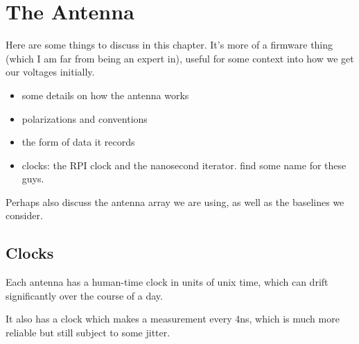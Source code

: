 \chapter{The Antenna}
\label{chap:antenna}

Here are some things to discuss in this chapter. It's more of a firmware thing (which I am far from being an expert in), useful for some context into how we get our voltages initially.
\begin{itemize}
    \item some details on how the antenna works
    \item polarizations and conventions
    \item the form of data it records
    \item clocks: the RPI clock and the nanosecond iterator. find some name for these guys.
\end{itemize}
Perhaps also discuss the antenna array we are using, as well as the baselines we consider.


\section{Clocks}


Each antenna has a human-time clock in units of unix time, which can drift significantly over the course of a day.

It also has a clock which makes a measurement every 4ns, which is much more reliable but still subject to some jitter.

